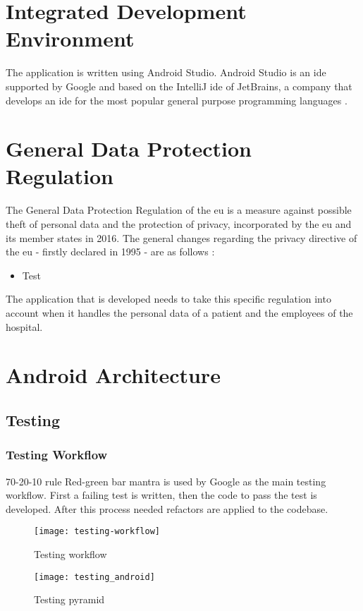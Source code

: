 \section{Integrated Development Environment}
The application is written using Android Studio. Android Studio is an \acrshort{ide} supported by Google and based on the IntelliJ \acrshort{ide} of JetBrains, a company that develops an \acrshort{ide} for the most popular general purpose programming languages \cite{AndroidDevelopers2019c}.
\section{General Data Protection Regulation}
The General Data Protection Regulation of the \acrfull{eu} is a measure against possible theft of personal data and the protection of privacy, incorporated by the \acrshort{eu} and its member states in 2016. The general changes regarding the privacy directive of the \acrshort{eu} - firstly declared in 1995 - are as follows \cite{THEEUROPEANPARLIAMENTANDTHECOUNCILOF1995} \cite{EUGDPRPortal:byTrunomi2019}:
\begin{itemize}
\item Test
\end{itemize}

The application that is developed needs to take this specific regulation into account when it handles the personal data of a patient and the employees of the hospital. 
\section{Android Architecture}
\subsection{Testing}
\subsubsection{Testing Workflow}
70-20-10 rule
Red-green bar mantra is used by Google as the main testing workflow. First a failing test is written, then the code to pass the test is developed. After this process needed refactors are applied to the codebase.
\begin{figure}
\texttt{[image: testing-workflow]}
\centering
\caption{Testing workflow~\cite{Google_testing2017}}
\end{figure}
\begin{figure}[h!]
\texttt{[image: testing\_android]}
\centering
\caption{Testing pyramid~\cite{FernandoSproviero2018}}
\end{figure}
